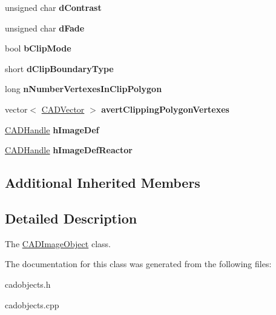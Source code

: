 \begin{DoxyCompactItemize}
\item 
unsigned char {\bfseries d\+Contrast}\hypertarget{class_c_a_d_image_object_ab3f4b2371ffa715c3f565dd29c7f38dc}{}\label{class_c_a_d_image_object_ab3f4b2371ffa715c3f565dd29c7f38dc}

\item 
unsigned char {\bfseries d\+Fade}\hypertarget{class_c_a_d_image_object_a9c7fb3e6570d198afb12e5e5877decb4}{}\label{class_c_a_d_image_object_a9c7fb3e6570d198afb12e5e5877decb4}

\item 
bool {\bfseries b\+Clip\+Mode}\hypertarget{class_c_a_d_image_object_a5ac504ec0ca34bb5ea3cd612b1f3b26b}{}\label{class_c_a_d_image_object_a5ac504ec0ca34bb5ea3cd612b1f3b26b}

\item 
short {\bfseries d\+Clip\+Boundary\+Type}\hypertarget{class_c_a_d_image_object_aaeec845db48525fc12324aefe904cfe2}{}\label{class_c_a_d_image_object_aaeec845db48525fc12324aefe904cfe2}

\item 
long {\bfseries n\+Number\+Vertexes\+In\+Clip\+Polygon}\hypertarget{class_c_a_d_image_object_a35f965686c72c7a294f754b1deb31482}{}\label{class_c_a_d_image_object_a35f965686c72c7a294f754b1deb31482}

\item 
vector$<$ \hyperlink{class_c_a_d_vector}{C\+A\+D\+Vector} $>$ {\bfseries avert\+Clipping\+Polygon\+Vertexes}\hypertarget{class_c_a_d_image_object_a46547fa998ac3705c768bf68ba5f1eaf}{}\label{class_c_a_d_image_object_a46547fa998ac3705c768bf68ba5f1eaf}

\item 
\hyperlink{class_c_a_d_handle}{C\+A\+D\+Handle} {\bfseries h\+Image\+Def}\hypertarget{class_c_a_d_image_object_a93000fa9564f5367a7cde0d84968b066}{}\label{class_c_a_d_image_object_a93000fa9564f5367a7cde0d84968b066}

\item 
\hyperlink{class_c_a_d_handle}{C\+A\+D\+Handle} {\bfseries h\+Image\+Def\+Reactor}\hypertarget{class_c_a_d_image_object_aedd9ca1c46af776a185370b395af5516}{}\label{class_c_a_d_image_object_aedd9ca1c46af776a185370b395af5516}

\end{DoxyCompactItemize}
\subsection*{Additional Inherited Members}


\subsection{Detailed Description}
The \hyperlink{class_c_a_d_image_object}{C\+A\+D\+Image\+Object} class. 

The documentation for this class was generated from the following files\+:\begin{DoxyCompactItemize}
\item 
cadobjects.\+h\item 
cadobjects.\+cpp\end{DoxyCompactItemize}
